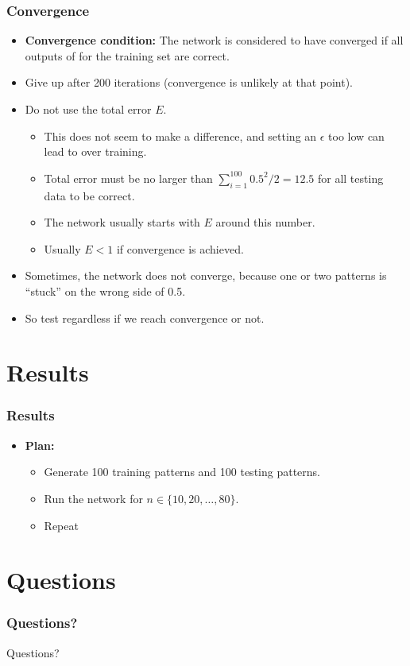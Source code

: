 \documentclass{beamer}
\numberwithin{equation}{section} %
\begin{document}
\begin{frame}
    \frametitle{Convergence}
    \begin{itemize}
        \item \textbf{Convergence condition: } The network is considered to have converged if all outputs of for the training set are correct.
        \pause
        \item Give up after 200 iterations (convergence is unlikely at that point).
        \pause
        \item Do not use the total error $E$.
        \pause
        \begin{itemize}
            \item This does not seem to make a difference, and setting an $\epsilon$ too low can lead to over training.
            \pause
            \item Total error must be no larger than $\sum_{i=1}^{100}{0.5^2}/2=12.5$ for all testing data to be correct.
            \pause
            \item The network usually starts with $E$ around this number.
            \pause
            \item Usually $E < 1$ if convergence is achieved.
        \end{itemize}
        \pause
        \item Sometimes, the network does not converge, because one or two patterns is ``stuck'' on the wrong side of 0.5.
        \pause
        \item So test regardless if we reach convergence or not.
    \end{itemize}
\end{frame}

\section{Results}

\begin{frame}
    \frametitle{Results}
    \begin{itemize}
        \item \textbf{Plan:}
        \begin{itemize}
            \item Generate 100 training patterns and 100 testing patterns.
            \pause
            \item Run the network for $n\in \{10, 20, \ldots, 80\}$.
            \pause
            \item Repeat
        \end{itemize}
    \end{itemize}
\end{frame}

\section{Questions}

\begin{frame}
    \frametitle{Questions?}
    \huge{Questions?}
\end{frame}
\end{document}
